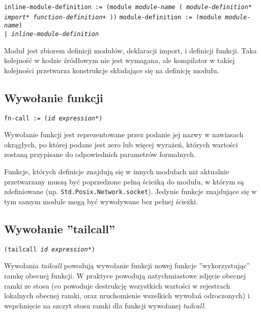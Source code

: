 \documentclass[11pt,oneside,a4paper,titlepage,onecolumn]{article}
\begin{document}
\texttt{inline-module-definition := (module \emph{module-name} (
\newline
\phantom{inline-module-definition := ~ }\emph{module-definition}*
\newline
\phantom{inline-module-definition := ~ }\emph{import}*
\newline
\phantom{inline-module-definition := ~ }\emph{function-definition}+
))}
\newline
\texttt{module-definition := (module \emph{module-name}) \\
\phantom{module-definition :}| \emph{inline-module-definition}}
\newline

Moduł jest zbiorem definicji modułów, deklaracji import, i definicji funkcji.
Taka kolejność w kodzie źródłowym nie jest wymagana, ale kompilator w takiej kolejności przetwarza konstrukcje
składające się na definicję modułu.

\subsection{Wywołanie funkcji}

\texttt{fn-call := (\emph{id} \emph{expression}*)}
\newline

Wywołanie funkcji jest reprezentowane przez podanie jej nazwy w nawiasach okrągłych, po której podane jest
zero lub więcej wyrażeń, których wartości zostaną przypisane do odpowiednich parametrów formalnych.

Funkcje, których definicje znajdują się w innych modułach niż aktualnie przetwarzany muszą być poprzedzone
pełną ścieżką do modułu, w którym są zdefiniowane (np. \texttt{Std.Posix.Network.socket}). Jedynie funkcje
znajdujące się w tym samym module mogą być wywoływane bez pełnej ścieżki.

\subsection{Wywołanie ''tailcall''}

\texttt{(tailcall \emph{id} \emph{expression}*)}
\newline

Wywołania \emph{tailcall} powodują wywołanie funkcji nowej funkcje ''wykorzystując'' ramkę obecnej funkcji.
W praktyce powodują natychmiastowe zdjęcie obecnej ramki ze stosu (co powoduje destrukcję wszystkich wartości
w rejestrach lokalnych obecnej ramki, oraz uruchomienie wszelkich wywołań odroczonych) i wepchnięcie na szczyt
stosu ramki dla funkcji wywołanej \emph{tailcall}.
\end{document}
